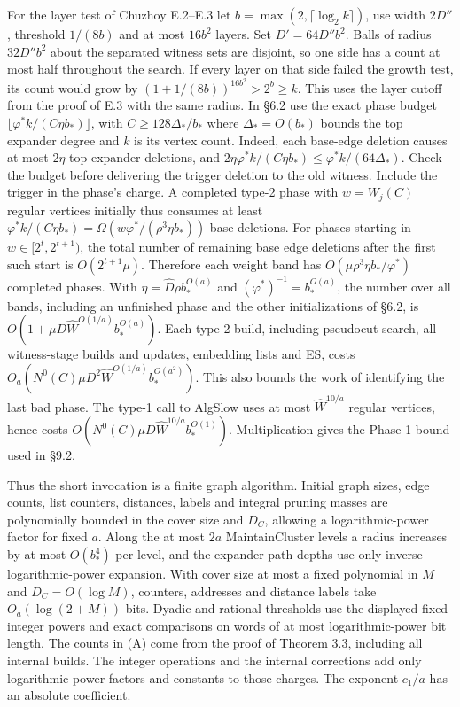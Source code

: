 \documentclass[11pt]{article}
\begin{document}
For the layer test of Chuzhoy E.2--E.3 let \(b=\max(2,\lceil\log_2 k\rceil)\), use width \(2D''\), threshold \(1/(8b)\) and at most \(16b^2\) layers. Set \(D'=64D''b^2\). Balls of radius \(32D''b^2\) about the separated witness sets are disjoint, so one side has a count at most half throughout the search. If every layer on that side failed the growth test, its count would grow by \((1+1/(8b))^{16b^2}>2^b\ge k\). This uses the layer cutoff from the proof of E.3 with the same radius. In §6.2 use the exact phase budget \(\lfloor\varphi^* k/(C\eta b_*)\rfloor\), with \(C\ge128\Delta_*/b_*\) where \(\Delta_*=O(b_*)\) bounds the top expander degree and \(k\) is its vertex count. Indeed, each base-edge deletion causes at most \(2\eta\) top-expander deletions, and \(2\eta\varphi^* k/(C\eta b_*)\le \varphi^* k/(64\Delta_*)\). Check the budget before delivering the trigger deletion to the old witness. Include the trigger in the phase's charge. A completed type-2 phase with \(w=W_j(C)\) regular vertices initially thus consumes at least \(\varphi^* k/(C\eta b_*)=\Omega(w\varphi^*/(\rho^3\eta b_*))\) base deletions. For phases starting in \(w\in[2^t,2^{t+1})\), the total number of remaining base edge deletions after the first such start is \(O(2^{t+1}\mu)\). Therefore each weight band has \(O(\mu\rho^3\eta b_*/\varphi^*)\) completed phases. With \(\eta=\widehat D\rho b_*^{O(a)}\) and \((\varphi^*)^{-1}=b_*^{O(a)}\), the number over all bands, including an unfinished phase and the other initializations of §6.2, is \(O(1+\mu D\widehat W^{O(1/a)}b_*^{O(a)})\). Each type-2 build, including pseudocut search, all witness-stage builds and updates, embedding lists and ES, costs \(O_a(N^0(C)\mu D^2\widehat W^{O(1/a)}b_*^{O(a^2)})\). This also bounds the work of identifying the last bad phase. The type-1 call to AlgSlow uses at most \(\widehat W^{10/a}\) regular vertices, hence costs \(O(N^0(C)\mu D\widehat W^{10/a} b_*^{O(1)})\). Multiplication gives the Phase 1 bound used in §9.2.

Thus the short invocation is a finite graph algorithm. Initial graph sizes, edge counts, list counters, distances, labels and integral pruning masses are polynomially bounded in the cover size and \(D_C\), allowing a logarithmic-power factor for fixed \(a\). Along the at most \(2a\) MaintainCluster levels a radius increases by at most \(O(b_*^4)\) per level, and the expander path depths use only inverse logarithmic-power expansion. With cover size at most a fixed polynomial in \(M\) and \(D_C=O(\log M)\), counters, addresses and distance labels take \(O_a(\log(2+M))\) bits. Dyadic and rational thresholds use the displayed fixed integer powers and exact comparisons on words of at most logarithmic-power bit length. The counts in (A) come from the proof of Theorem 3.3, including all internal builds. The integer operations and the internal corrections add only logarithmic-power factors and constants to those charges. The exponent \(c_1/a\) has an absolute coefficient.
\end{document}
